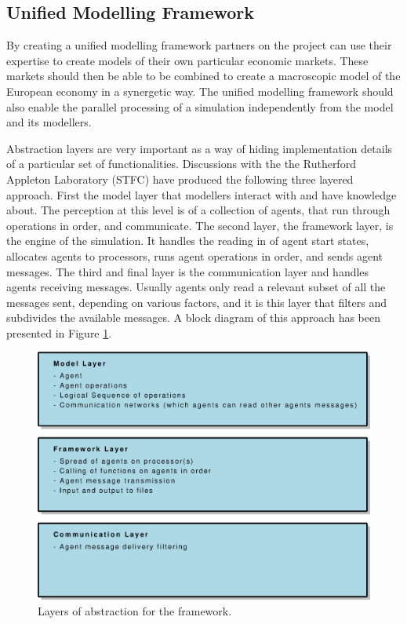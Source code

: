 \documentclass[a4paper,11pt]{article}
\begin{document}
\subsection{Unified Modelling Framework}
\label{sec:unimodframework}

By creating a unified modelling framework partners on the project
can use their expertise to create models of their own particular
economic markets. These markets should then be able to be combined to create a macroscopic model of the European economy in a synergetic
way. The unified modelling framework should also enable the parallel
processing of a simulation independently from the model
and its modellers.

Abstraction layers are very important as a way of
hiding implementation details of a particular set of
functionalities. Discussions with the the Rutherford Appleton
Laboratory (STFC) have produced the following three layered
approach. First the model layer that modellers interact with and
have knowledge about. The perception at this level is of a
collection of agents, that run through operations in order, and
communicate. The second layer, the framework layer, is the engine of
the simulation. It handles the reading in of agent start states,
allocates agents to processors, runs agent operations in order,
and sends agent messages. The third and final layer is the
communication layer and handles agents receiving messages.
Usually agents only read a relevant subset of all the messages
sent, depending on various factors, and it is this layer that
filters and subdivides the available messages. A block diagram
of this approach has been presented in Figure \ref{fig:layers}.

\begin{figure}
\begin{center}
\includegraphics[width=\linewidth]{layers_1.eps}
\caption{Layers of abstraction for the framework.}
\label{fig:layers}
\end{center}
\end{figure}
\end{document}
